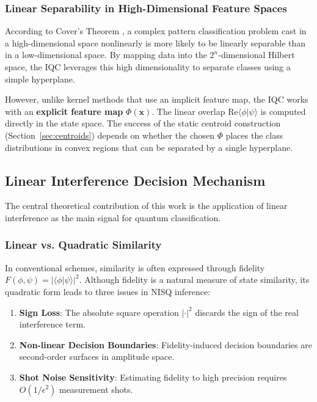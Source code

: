 \documentclass[conference]{IEEEtran}
\begin{document}
\subsubsection{Linear Separability in High-Dimensional Feature Spaces}
According to Cover's Theorem \cite{cover1965geometrical}, a complex pattern classification problem cast in a high-dimensional space nonlinearly is more likely to be linearly separable than in a low-dimensional space. By mapping data into the $2^n$-dimensional Hilbert space, the IQC leverages this high dimensionality to separate classes using a simple hyperplane.

However, unlike kernel methods that use an implicit feature map, the IQC works with an \textbf{explicit feature map} $\Phi(\mathbf{x})$. The linear overlap $\mathrm{Re}\langle \phi | \psi \rangle$ is computed directly in the state space. The success of the static centroid construction (Section~\ref{sec:centroids}) depends on whether the chosen $\Phi$ places the class distributions in convex regions that can be separated by a single hyperplane.

\subsection{Linear Interference Decision Mechanism}
The central theoretical contribution of this work is the application of linear interference as the main signal for quantum classification.

\subsubsection{Linear vs. Quadratic Similarity}
In conventional schemes, similarity is often expressed through fidelity $F(\phi, \psi) = |\langle \phi | \psi \rangle|^2$. Although fidelity is a natural measure of state similarity, its quadratic form leads to three issues in NISQ inference:
\begin{enumerate}
    \item \textbf{Sign Loss}: The absolute square operation $|\cdot|^2$ discards the sign of the real interference term.
    \item \textbf{Non-linear Decision Boundaries}: Fidelity-induced decision boundaries are second-order surfaces in amplitude space.
    \item \textbf{Shot Noise Sensitivity}: Estimating fidelity to high precision requires $O(1/\epsilon^2)$ measurement shots.
\end{enumerate}
\end{document}
